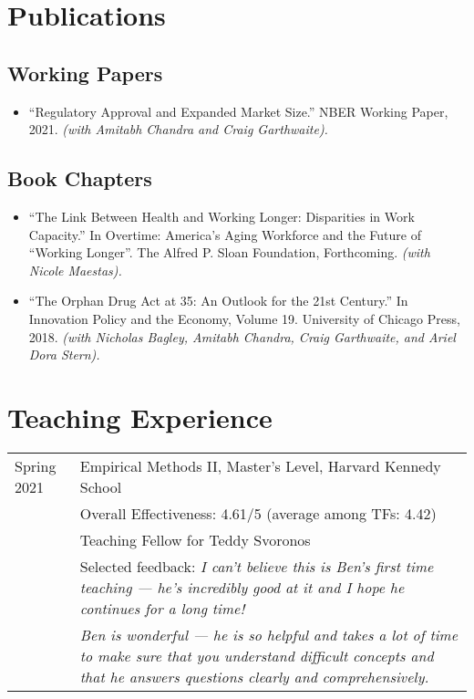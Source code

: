 \documentclass[letterpaper]{article}
\begin{document}
\section*{Publications}
\subsection*{Working Papers}
\begin{itemize}
	\item ``Regulatory Approval and Expanded Market Size.'' NBER Working Paper, 2021. \textit{(with Amitabh Chandra and Craig Garthwaite).}
\end{itemize}

\subsection*{Book Chapters}
\begin{itemize}
	\item ``The Link Between Health and Working Longer: Disparities in Work Capacity.'' In Overtime: America's Aging Workforce and the Future of ``Working Longer''. The Alfred P. Sloan Foundation, Forthcoming. \textit{(with Nicole Maestas).}
	
	\item ``The Orphan Drug Act at 35: An Outlook for the 21st Century.'' In Innovation Policy and the Economy, Volume 19. University of Chicago Press, 2018. \textit{(with Nicholas Bagley, Amitabh Chandra, Craig Garthwaite, and Ariel Dora Stern).}
\end{itemize}

\section*{Teaching Experience}
\begin{tabularx}{\linewidth}{@{}l X}
	Spring 2021 & Empirical Methods II, Master's Level, Harvard Kennedy School \\ & Overall Effectiveness: 4.61/5 (average among TFs: 4.42)\\
	& Teaching Fellow for Teddy Svoronos \\
	& Selected feedback: \textit{I can't believe this is Ben's first time teaching --- he's incredibly good at it and I hope he continues for a long time!} \\
	& \textit{Ben is wonderful --- he is so helpful and takes a lot of time to make sure that you understand difficult concepts and that he answers questions clearly and comprehensively.}
\end{tabularx}
\end{document}
